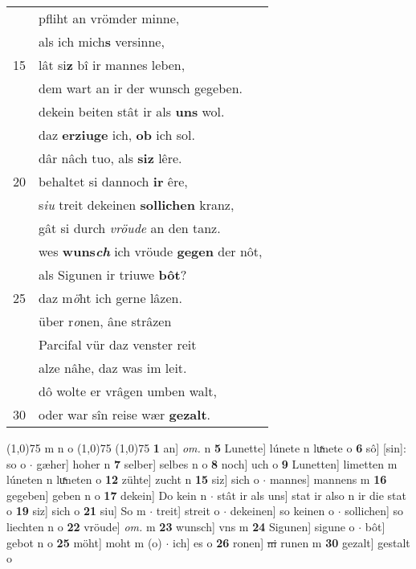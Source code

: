 \documentclass[8pt,a4paper,notitlepage]{article}
\begin{document}
\begin{table}[ht]
\begin{minipage}[t]{0.5\linewidth}
\begin{tabular}{rl}
 & pfliht an vrömder minne,\\ 
 & als ich mich\textbf{s} versinne,\\ 
15 & lât si\textbf{z} bî ir mannes leben,\\ 
 & dem wart an ir der wunsch gegeben.\\ 
 & dekein beiten stât ir als \textbf{uns} wol.\\ 
 & daz \textbf{erziuge} ich, \textbf{ob} ich sol.\\ 
 & dâr nâch tuo, als \textbf{siz} lêre.\\ 
20 & behaltet si dannoch \textbf{ir} êre,\\ 
 & s\textit{iu} treit dekeinen \textbf{sollichen} kranz,\\ 
 & gât si durch \textit{vröude} an den tanz.\\ 
 & wes \textbf{wuns\textit{ch}} ich vröude \textbf{gegen} der nôt,\\ 
 & als Sigunen ir triuwe \textbf{bôt}?\\ 
25 & daz m\textit{ö}ht ich gerne lâzen.\\ 
 & über r\textit{o}nen, âne strâzen\\ 
 & Parcifal vür daz venster reit\\ 
 & alze nâhe, daz was im leit.\\ 
 & dô wolte er vrâgen umben walt,\\ 
30 & oder war sîn reise wær \textbf{gezalt}.\\ 
\end{tabular}
\scriptsize
\line(1,0){75} \newline
m n o \newline
\line(1,0){75} \newline
\newline
\line(1,0){75} \newline
\textbf{1} an] \textit{om.} n \textbf{5} Lunette] lúnete n luͯnete o \textbf{6} sô] [sin]: so o  $\cdot$ gæher] hoher n \textbf{7} selber] selbes n o \textbf{8} noch] uch o \textbf{9} Lunetten] limetten m lúneten n luͯneten o \textbf{12} zühte] zucht n \textbf{15} siz] sich o  $\cdot$ mannes] mannens m \textbf{16} gegeben] geben n o \textbf{17} dekein] Do kein n  $\cdot$ stât ir als uns] stat ir also n ir die stat o \textbf{19} siz] sich o \textbf{21} siu] So m  $\cdot$ treit] streit o  $\cdot$ dekeinen] so keinen o  $\cdot$ sollichen] so liechten n o \textbf{22} vröude] \textit{om.} m \textbf{23} wunsch] vns m \textbf{24} Sigunen] sigune o  $\cdot$ bôt] gebot n o \textbf{25} möht] moht m (o)  $\cdot$ ich] es o \textbf{26} ronen] \sout{ni} runen m \textbf{30} gezalt] gestalt o \newline
\end{minipage}
\end{table}
\end{document}
